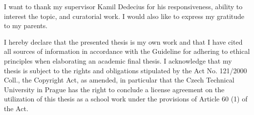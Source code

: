 \documentclass[english,master,unicode]{ctufit-thesis}
\theoremstyle{plain}
\theoremstyle{definition}
\theoremstyle{remark}
\numberwithin{theorem}{chapter}
\begin{document}
 
\frontmatter\frontmatterinit %


\thispagestyle{empty}\cleardoublepage\maketitle %

\imprintpage %

\tableofcontents %
\listoffigures %
\begingroup
\let\clearpage\relax
\listoftables %
\lstlistoflistings %
\endgroup

\begin{acknowledgmentpage}
	I want to thank my supervisor Kamil Dedecius for his responsiveness, ability to interest the topic, and curatorial work. I would also like to express my gratitude to my parents.
\end{acknowledgmentpage} 


\begin{declarationpage}
I hereby declare that the presented thesis is my own work and that I have cited all sources of information in accordance with the Guideline for adhering to ethical principles when elaborating an academic final thesis.
I acknowledge that my thesis is subject to the rights and obligations stipulated by the Act No. 121/2000 Coll., the Copyright Act, as amended, in particular that the Czech Technical University in Prague has the right to conclude a license agreement on the utilization of this thesis as a school work under the provisions of Article 60 (1) of the Act.
\end{declarationpage}
\end{document}
